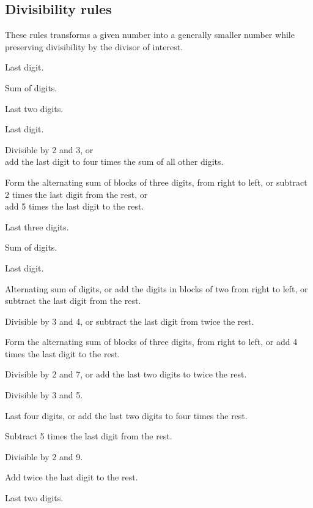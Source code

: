
\subsection{Divisibility rules}
These rules transforms a given number into a generally smaller number while preserving divisibility by the divisor of interest.

\begin{compactenum}
	\scriptsize
	\setcounter{enumi}{1}
	\item Last digit.
	\item Sum of digits.
	\item Last two digits.
	\item Last digit.
	\item Divisible by 2 and 3, or\\
		add the last digit to four times the sum of all other digits.
	\item Form the alternating sum of blocks of three digits, from right to left, or
		subtract 2 times the last digit from the rest, or\\
		add 5 times the last digit to the rest.
	\item Last three digits.
	\item Sum of digits.
	\item Last digit.
	\item Alternating sum of digits, or
		add the digits in blocks of two from right to left, or
		subtract the last digit from the rest.
	\item Divisible by 3 and 4, or
		subtract the last digit from twice the rest.
	\item Form the alternating sum of blocks of three digits, from right to left, or
		add 4 times the last digit to the rest.
	\item Divisible by 2 and 7, or
		add the last two digits to twice the rest.
	\item Divisible by 3 and 5.
	\item Last four digits, or
		add the last two digits to four times the rest.
	\item Subtract 5 times the last digit from the rest.
	\item Divisible by 2 and 9.
	\item Add twice the last digit to the rest.
	\item Last two digits.
\end{compactenum}
